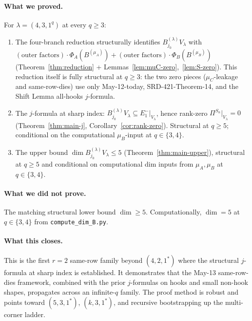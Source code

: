 \documentclass[11pt]{article}
\theoremstyle{definition}
\begin{document}
\paragraph{What we proved.}
For $\lambda = (4, 3, 1^q)$ at every $q \ge 3$:
\begin{enumerate}[leftmargin=2em,topsep=0.2em,itemsep=0.1em]
\item The four-branch reduction structurally identifies
$B^{(\lambda)}_{j_0} V_\lambda$ with $(\text{outer factors})
\cdot \Phi_A(B^{(\mu_A)}) + (\text{outer factors})
\cdot \Phi_B(B^{(\mu_B)})$ (Theorem~\ref{thm:reduction} +
Lemmas~\ref{lem:muC-zero},~\ref{lem:S-zero}). This reduction
itself is fully structural at $q \ge 3$: the two zero pieces
($\mu_C$-leakage and same-row-dies) use only May-12-today,
SRD-421-Theorem-14, and the Shift Lemma all-hooks $j$-formula.
\item The $j$-formula at sharp index:
$B^{(\lambda)}_{j_0} V_\lambda \subseteq E_1^-|_{V_\lambda}$, hence
rank-zero $\Pi^{S_n}|_{V_\lambda} = 0$
(Theorem~\ref{thm:main-j}, Corollary~\ref{cor:rank-zero}).
Structural at $q \ge 5$; conditional on the computational
$\mu_B$-input at $q \in \{3, 4\}$.
\item The upper bound $\dim B^{(\lambda)}_{j_0} V_\lambda \le 5$
(Theorem~\ref{thm:main-upper}), structural at $q \ge 5$ and
conditional on computational dim inputs from
$\mu_A, \mu_B$ at $q \in \{3, 4\}$.
\end{enumerate}

\paragraph{What we did not prove.}
The matching structural lower bound $\dim \ge 5$.
Computationally, $\dim = 5$ at $q \in \{3, 4\}$ from
\texttt{compute\_dim\_B.py}.

\paragraph{What this closes.}
This is the first $r = 2$ same-row family beyond $(4, 2, 1^*)$ where
the structural $j$-formula at sharp index is established. It
demonstrates that the May-13 same-row-dies framework, combined with
the prior $j$-formulas on hooks and small non-hook shapes, propagates
across an infinite-$q$ family. The proof method is robust and points
toward $(5, 3, 1^*)$, $(k, 3, 1^*)$, and recursive bootstrapping up
the multi-corner ladder.
\end{document}
